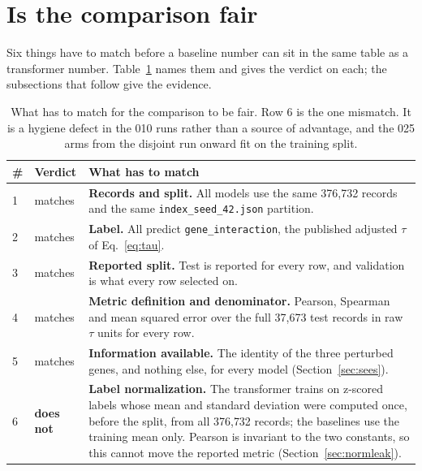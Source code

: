 
\section{Is the comparison fair}
\label{sec:comparability}

Six things have to match before a baseline number can sit in the same table as a
transformer number. Table~\ref{tab:comparability} names them and gives the
verdict on each; the subsections that follow give the evidence.

\begin{table}[htbp]
\centering
\begin{tabular}{llp{}}
\hline
\# & Verdict & What has to match \\
\hline
1 & matches & \textbf{Records and split.} All models use the same 376{,}732
    records and the same \texttt{index\_seed\_42.json} partition. \\
2 & matches & \textbf{Label.} All predict \texttt{gene\_interaction}, the
    published adjusted $\tau$ of Eq.~\ref{eq:tau}. \\
3 & matches & \textbf{Reported split.} Test is reported for every row, and
    validation is what every row selected on. \\
4 & matches & \textbf{Metric definition and denominator.} Pearson, Spearman and
    mean squared error over the full 37{,}673 test records in raw $\tau$ units
    for every row. \\
5 & matches & \textbf{Information available.} The identity of the three
    perturbed genes, and nothing else, for every model
    (Section~\ref{sec:sees}). \\
6 & \textbf{does not} & \textbf{Label normalization.} The transformer trains on
    z-scored labels whose mean and standard deviation were computed once, before
    the split, from all 376{,}732 records; the baselines use the training mean
    only. Pearson is invariant to the two constants, so this cannot move the
    reported metric (Section~\ref{sec:normleak}). \\
\hline
\end{tabular}
\caption{What has to match for the comparison to be fair. Row 6 is the one
mismatch. It is a hygiene defect in the 010 runs rather than a source of
advantage, and the 025 arms from the disjoint run onward fit on the training
split.}
\label{tab:comparability}
\end{table}

